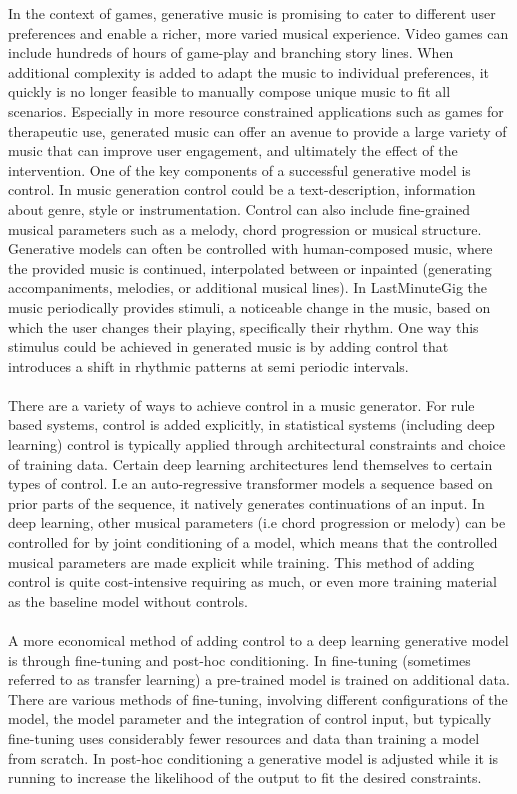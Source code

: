 In the context of games, generative music is promising to cater to different user preferences and enable a richer, more varied musical experience. Video games can include hundreds of hours of game-play and branching story lines. When additional complexity is added to adapt the music to individual preferences, it quickly is no longer feasible to manually compose unique music to fit all scenarios. Especially in more resource constrained applications such as games for therapeutic use, generated music can offer an avenue to provide a large variety of music that can improve user engagement, and ultimately the effect of the intervention.
One of the key components of a successful generative model is control. In music generation control could be a text-description, information about genre, style or instrumentation. Control can also include fine-grained musical parameters such as a melody, chord progression or musical structure. Generative models can often be controlled with human-composed music, where the provided music is continued, interpolated between or inpainted (generating accompaniments, melodies, or additional musical lines). In LastMinuteGig\cite{Chalkiadakis_2022} the music periodically provides stimuli, a noticeable change in the music, based on which the user changes their playing, specifically their rhythm. One way this stimulus could be achieved in generated music is by adding control that introduces a shift in rhythmic patterns at semi periodic intervals. \\\\
There are a variety of ways to achieve control in a music generator. For rule based systems, control is added explicitly, in statistical systems (including deep learning) control is typically applied through architectural constraints and choice of training data. Certain deep learning architectures lend themselves to certain types of control. I.e an auto-regressive transformer models a sequence based on prior parts of the sequence, it natively generates continuations of an input. In deep learning, other musical parameters (i.e chord progression or melody) can be controlled for  by joint conditioning of a model, which means that the controlled musical parameters are made explicit while training. This method of adding control is quite cost-intensive requiring as much, or even more training material as the baseline model without controls. \\\\
A more economical method of adding control to a deep learning generative model is through fine-tuning and post-hoc conditioning. In fine-tuning (sometimes referred to as transfer learning) a pre-trained model is trained on additional data. There are various methods of fine-tuning, involving different configurations of the model, the model parameter and  the integration of control input, but typically fine-tuning uses considerably fewer resources and data than training a model from scratch. In post-hoc conditioning a generative model is adjusted while it is running to increase the likelihood of the output to fit the desired constraints. 
